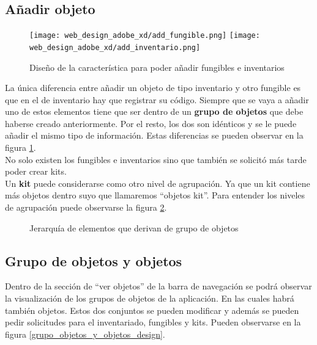 \subsection{Añadir objeto}

\begin{figure}[h]
    \begin{center}
        \texttt{[image: web\_design\_adobe\_xd/add\_fungible.png]}
        \texttt{[image: web\_design\_adobe\_xd/add\_inventario.png]}
        \caption{Diseño de la característica para poder añadir fungibles e inventarios}\label{adicion_inventario_fungible_design}
    \end{center}
\end{figure}

La única diferencia entre añadir un objeto de tipo inventario y otro fungible es que en el de inventario hay que registrar su código. Siempre que se vaya a añadir uno de estos elementos tiene que ser dentro de un \textbf{grupo de objetos} que debe haberse creado anteriormente. Por el resto, los dos son idénticos y se le puede añadir el mismo tipo de información. Estas diferencias se pueden observar en la figura \ref{adicion_inventario_fungible_design}.
\\No solo existen los fungibles e inventarios sino que también se solicitó más tarde poder crear kits.
\\Un \textbf{kit} puede considerarse como otro nivel de agrupación. Ya que un kit contiene más objetos dentro suyo que llamaremos ``objetos kit''. Para entender los niveles de agrupación puede observarse la figura \ref{jerarquia_grupo_objetos}.

\begin{figure}[h]
    \caption{Jerarquía de elementos que derivan de grupo de objetos}\label{jerarquia_grupo_objetos}
\end{figure}

\subsection{Grupo de objetos y objetos}

Dentro de la sección de ``ver objetos'' de la barra de navegación se podrá observar la visualización de los grupos de objetos de la aplicación. En las cuales habrá también objetos. Estos dos conjuntos se pueden modificar y además se pueden pedir solicitudes para el inventariado, fungibles y kits. Pueden observarse en la figura \ref{grupo_objetos_y_objetos_design}.

